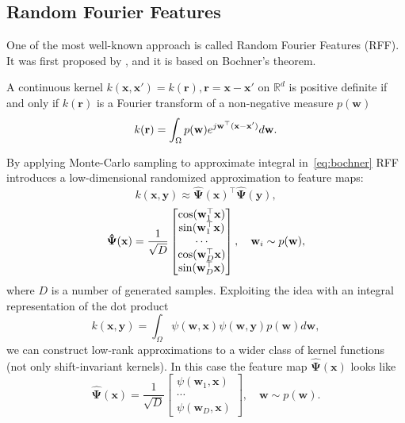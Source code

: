 \subsection{Random Fourier Features}
\label{sec:random_fourier_features}
One of the most well-known approach is called
Random Fourier Features (RFF).
It was first proposed by \citep{rahimi2008random}, and it is based on Bochner's theorem.
\begin{theorem}[Bochner]
    A continuous kernel $k(\mathbf{x, x'}) = k(\mathbf{r}), \mathbf{r = x - x'}$ on
    $\mathbb{R}^d$ is positive definite if and only if
    $k(\mathbf{r})$ is a Fourier transform of a non-negative measure $p(\mathbf{w})$
    \begin{equation}
    \label{eq:bochner}
        k(\mathbf{r}) = \int_{\Omega} p(\mathbf{w}) e^{j\mathbf{w^{\top}(x - x')}} d\mathbf{w}.
    \end{equation}
\end{theorem}
By applying Monte-Carlo sampling to approximate integral in~\eqref{eq:bochner}
RFF introduces a low-dimensional randomized approximation to feature maps:
\begin{equation}
\label{eq:inner}
    k(\mathbf{x, y}) \approx
    \mathbf{\hat{\Psi}}(\mathbf{x})^{\boldsymbol{\top}} \mathbf{\hat{\Psi}}(\mathbf{y}),
\end{equation}
\[
    \mathbf{\hat{\Psi}}(\mathbf{x}) =
    \frac{1}{\sqrt{D}} \begin{bmatrix}
        \cos(\mathbf{w}_1^\top\mathbf{x}) \\
        \sin(\mathbf{w}_1^\top \mathbf{x}) \\
        \cdots \\
        \cos(\mathbf{w}_D^\top \mathbf{x}) \\
        \sin(\mathbf{w}_D^\top \mathbf{x}) \\
    \end{bmatrix}, \quad \mathbf{w}_i \sim p(\mathbf{w}),
\]
where $D$ is a number of generated samples.
Exploiting the idea with an integral representation of the dot product
\[
k(\mathbf{x, y}) = \int_{\Omega} \psi(\mathbf{w, x}) \psi(\mathbf{w, y}) p(\mathbf{w}) d\mathbf{w},
\]
we can construct low-rank approximations to a wider class of kernel functions
(not only shift-invariant kernels).
In this case the feature map $\mathbf{\hat{\Psi}}(\mathbf{x})$ looks like
\[
    \mathbf{\hat{\Psi}}(\mathbf{x}) = \frac{1}{\sqrt{D}} \begin{bmatrix}
        \psi(\mathbf{w}_1, \mathbf{x}) \\
        \cdots \\
        \psi(\mathbf{w}_D, \mathbf{x})
    \end{bmatrix},
    \quad
    \mathbf{w} \sim p(\mathbf{w}).
\]








